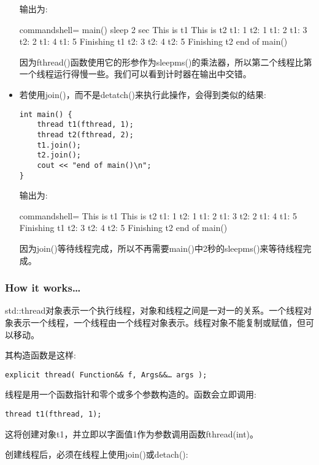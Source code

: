 \begin{itemize}
输出为:

\begin{tcblisting}{commandshell={}}
main() sleep 2 sec
This is t1
This is t2
t1: 1
t2: 1
t1: 2
t1: 3
t2: 2
t1: 4
t1: 5
Finishing t1
t2: 3
t2: 4
t2: 5
Finishing t2
end of main()
\end{tcblisting}

因为fthread()函数使用它的形参作为sleepms()的乘法器，所以第二个线程比第一个线程运行得慢一些。我们可以看到计时器在输出中交错。

\item 
若使用join()，而不是detatch()来执行此操作，会得到类似的结果:

\begin{lstlisting}[style=styleCXX]
int main() {
	thread t1(fthread, 1);
	thread t2(fthread, 2);
	t1.join();
	t2.join();
	cout << "end of main()\n";
}
\end{lstlisting}

输出为:

\begin{tcblisting}{commandshell={}}
This is t1
This is t2
t1: 1
t2: 1
t1: 2
t1: 3
t2: 2
t1: 4
t1: 5
Finishing t1
t2: 3
t2: 4
t2: 5
Finishing t2
end of main()
\end{tcblisting}

因为join()等待线程完成，所以不再需要main()中2秒的sleepms()来等待线程完成。
\end{itemize}

\subsubsection{How it works…}

std::thread对象表示一个执行线程，对象和线程之间是一对一的关系。一个线程对象表示一个线程，一个线程由一个线程对象表示。线程对象不能复制或赋值，但可以移动。

其构造函数是这样:

\begin{lstlisting}[style=styleCXX]
explicit thread( Function&& f, Args&&… args );
\end{lstlisting}

线程是用一个函数指针和零个或多个参数构造的。函数会立即调用:

\begin{lstlisting}[style=styleCXX]
thread t1(fthread, 1);
\end{lstlisting}

这将创建对象t1，并立即以字面值1作为参数调用函数fthread(int)。

创建线程后，必须在线程上使用join()或detach():

